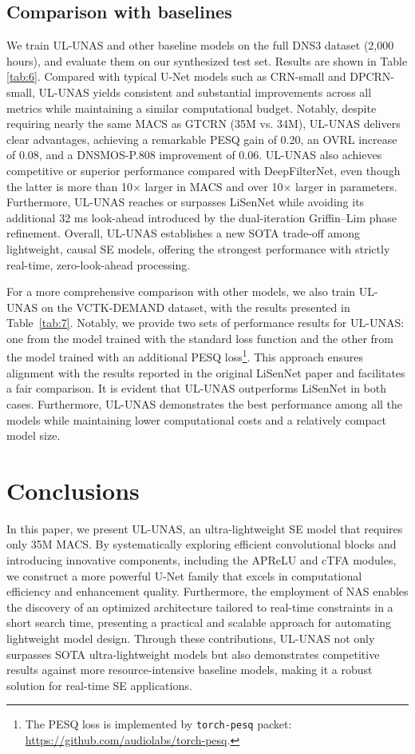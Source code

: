 \documentclass[journal]{IEEEtran}
\newcommand{\rev}[1]{#1}
\begin{document}
\subsection{Comparison with baselines}
We train UL-UNAS and other baseline models on the full DNS3 dataset (2,000 hours), and evaluate them on our synthesized test set. Results are shown in Table \ref{tab:6}. \rev{Compared with typical U-Net models such as CRN-small and DPCRN-small, UL-UNAS yields consistent and substantial improvements across all metrics while maintaining a similar computational budget. Notably, despite requiring nearly the same MACS as GTCRN (35M vs. 34M), UL-UNAS delivers clear advantages, achieving a remarkable PESQ gain of 0.20, an OVRL increase of 0.08, and a DNSMOS-P.808 improvement of 0.06.
UL-UNAS also achieves competitive or superior performance compared with DeepFilterNet, even though the latter is more than 10$\times$ larger in MACS and over 10$\times$ larger in parameters. 
Furthermore, UL-UNAS reaches or surpasses LiSenNet while avoiding its additional 32 ms look-ahead introduced by the dual-iteration Griffin–Lim phase refinement. Overall, UL-UNAS establishes a new SOTA trade-off among lightweight, causal SE models, offering the strongest performance with strictly real-time, zero-look-ahead processing.}

For a more comprehensive comparison with other models, we also train UL-UNAS on the VCTK-DEMAND dataset, with the results presented in Table~\ref{tab:7}. Notably, we provide two sets of performance results for UL-UNAS: one from the model trained with the standard loss function and the other from the model trained with an additional PESQ loss\footnote{The PESQ loss is implemented by \texttt{torch-pesq} packet: \url{https://github.com/audiolabs/torch-pesq}.}. This approach ensures alignment with the results reported in the original LiSenNet paper and facilitates a fair comparison. It is evident that UL-UNAS outperforms LiSenNet in both cases. Furthermore, UL-UNAS demonstrates the best performance among all the models while maintaining lower computational costs and a relatively compact model size.

\section{Conclusions}
\label{sec:conclusion}
In this paper, we present UL-UNAS, an ultra-lightweight SE model that requires only \rev{35M} MACS. By systematically exploring efficient convolutional blocks and introducing innovative components, including the APReLU and cTFA modules, we construct a more powerful U-Net family that excels in computational efficiency and enhancement quality. Furthermore, the employment of NAS enables the discovery of an optimized architecture tailored to real-time constraints \rev{in a short search time, presenting a practical and scalable approach for automating lightweight model design.} Through these contributions, UL-UNAS not only surpasses SOTA ultra-lightweight models but also demonstrates competitive results against more resource-intensive baseline models, making it a robust solution for real-time SE applications.



\end{document}
